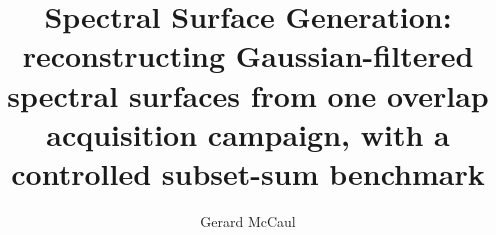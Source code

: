 \documentclass[reprint,aps,prx,showpacs,bibfootnote,preprintnumbers,superscriptaddress,amsmath,amssymb]{revtex4-2}
\begin{document}
\title{Spectral Surface Generation: reconstructing Gaussian-filtered spectral surfaces from one overlap acquisition campaign, with a controlled subset-sum benchmark}
\author{Gerard McCaul}
\maketitle



















\appendix






\end{document}
